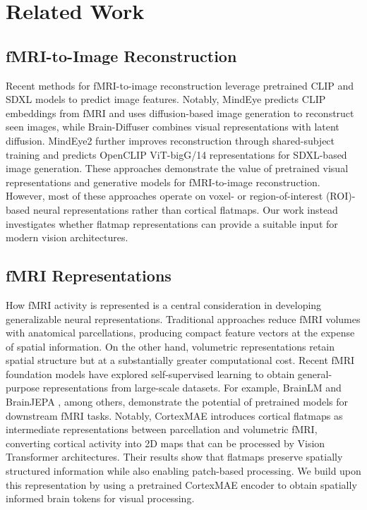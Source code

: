 \section{Related Work}
\label{sec:related_works}
\subsection{fMRI-to-Image Reconstruction}
Recent methods for fMRI-to-image reconstruction leverage pretrained CLIP and SDXL models to predict image features. Notably, MindEye \cite{scotti2023reconstructingmindseyefmritoimage} predicts CLIP embeddings from fMRI and uses diffusion-based image generation to reconstruct seen images, while Brain-Diffuser \cite{ozcelik2023brain} combines visual representations with latent diffusion. MindEye2 further improves reconstruction through shared-subject training and predicts OpenCLIP ViT-bigG/14 representations \cite{schuhmann2022laionb, ilharco_gabriel_2021_5143773} for SDXL-based image generation. These approaches demonstrate the value of pretrained visual representations and generative models for fMRI-to-image reconstruction. However, most of these approaches operate on voxel- or region-of-interest (ROI)-based neural representations rather than cortical flatmaps. Our work instead investigates whether flatmap representations can provide a suitable input for modern vision architectures.

\subsection{fMRI Representations}
How fMRI activity is represented is a central consideration in developing generalizable neural representations. Traditional approaches reduce fMRI volumes with anatomical parcellations, producing compact feature vectors at the expense of spatial information. On the other hand, volumetric representations retain spatial structure but at a substantially greater computational cost. Recent fMRI foundation models have explored self-supervised learning to obtain general-purpose representations from large-scale datasets. For example, BrainLM \cite{Caro2023.09.12.557460} and BrainJEPA \cite{dong2024brainjepabraindynamicsfoundation}, among others, demonstrate the potential of pretrained models for downstream fMRI tasks. Notably, CortexMAE introduces cortical flatmaps as intermediate representations between parcellation and volumetric fMRI, converting cortical activity into 2D maps that can be processed by Vision Transformer architectures. Their results show that flatmaps preserve spatially structured information while also enabling patch-based processing. We build upon this representation by using a pretrained CortexMAE encoder to obtain spatially informed brain tokens for visual processing.

